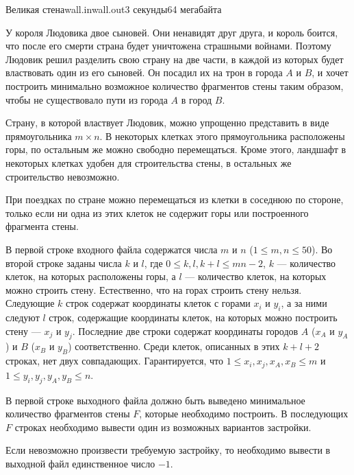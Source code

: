 \begin{problem}{Великая стена}{wall.in}{wall.out}{3 секунды}{64 мегабайта}

У короля Людовика двое сыновей. Они ненавидят друг друга, и король боится, что
после его смерти страна будет уничтожена страшными войнами. Поэтому Людовик
решил разделить свою страну на две части, в каждой из которых будет властвовать
один из его сыновей. Он посадил их на трон в города $A$ и $B$, и хочет построить
минимально возможное количество фрагментов стены таким образом, чтобы не
существовало пути из города $A$ в город $B$.

Страну, в которой властвует Людовик, можно упрощенно представить в виде 
прямоугольника $m\times n$. В некоторых клетках этого прямоугольника расположены
горы, по остальным же можно свободно перемещаться. Кроме этого, ландшафт в
некоторых клетках удобен для строительства стены, в остальных же строительство
невозможно.

При поездках по стране можно перемещаться из клетки в соседнюю по стороне, 
только если ни одна из этих клеток не содержит горы или построенного
фрагмента стены.

\InputFile

В первой строке входного файла содержатся числа $m$ и $n$ ($1\le m, n\le 50$).
Во второй строке заданы числа $k$ и $l$, где $0\le k, l, k+l\le mn-2$, $k$ ---
количество клеток, на которых расположены горы, а $l$ --- количество клеток,
на которых можно строить стену. Естественно, что на горах строить стену нельзя.
Следующие $k$ строк содержат координаты клеток с горами $x_i$ и $y_i$, а за ними
следуют $l$ строк, содержащие координаты клеток, на которых можно построить 
стену --- $x_j$ и $y_j$. 
Последние две строки содержат координаты городов $A$ ($x_A$ и $y_A$) и $B$ 
($x_B$ и $y_B$) соответственно.
Среди клеток, описанных в этих $k+l+2$ строках, нет
двух совпадающих. Гарантируется, что $1\le x_i, x_j, x_A, x_B\le m$ и 
$1\le y_i, y_j, y_A, y_B\le n$.

\OutputFile

В первой строке выходного файла должно быть выведено минимальное количество
фрагментов стены $F$, которые необходимо построить. В последующих $F$ строках
необходимо вывести один из возможных вариантов застройки.

Если невозможно произвести требуемую застройку, то 
необходимо вывести в выходной файл единственное число $-1$.

\Example
\parindent=0mm
\begin{example}
%
\end{example}

\end{problem}
